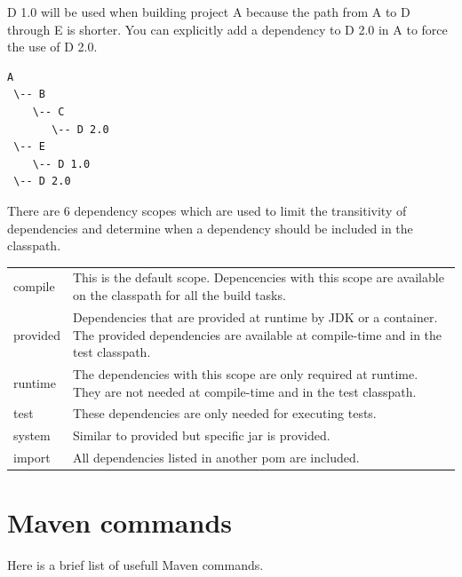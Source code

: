 D 1.0 will be used when building project A because the path from A to D through E is shorter. You can explicitly add a dependency to D 2.0 in A to force the use of D 2.0.

\begin{verbatim}
A
 \-- B
    \-- C
       \-- D 2.0
 \-- E
    \-- D 1.0
 \-- D 2.0
 \end{verbatim}

There are 6 dependency scopes which are used to limit the transitivity of dependencies and determine when a dependency should be included in the classpath.

\begin{tabularx}{\textwidth}{ |l|X| } 
 \hline
 compile & 
This is the default scope. Depencencies with this scope are available on the classpath for all the build tasks.\\
provided &
Dependencies that are provided at runtime by JDK or a container. The provided dependencies are available at compile-time and in the test classpath.\\
runtime &
The dependencies with this scope are only required at runtime. They are not needed at compile-time and in the test classpath.\\
test &
These dependencies are only needed for executing tests.\\
system &
Similar to provided but specific jar is provided.\\ 
import &
All dependencies listed in another pom are included.\\
\hline
\end{tabularx}


\section{Maven commands}

Here is a brief list of usefull Maven commands.

